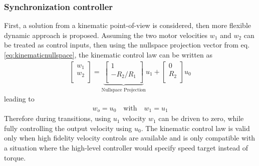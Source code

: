 \subsubsection{Synchronization controller}
First, a solution from a kinematic point-of-view is considered, then more flexible dynamic approach is proposed. Assuming the two motor velocities $w_1$ and $w_2$ can be treated as control inputs, then using the nullspace projection vector from eq.\eqref{eq:kinematicnullspace}, the kinematic control law can be written as 
%
\begin{align}
\left[
\begin{array}{c}
w_1 \\
w_2 \\
\end{array}
\right]=
\underbrace{\left[
\begin{array}{c}
1 \\
-R_2/R_1 \\
\end{array}
\right]}_{\text{Nullspace Projection}}
u_1 + 
\left[
\begin{array}{c}
0 \\
R_2 \\
\end{array}
\right] u_0
\label{eq:kinematicsys}
\end{align}
%
leading to
%
\begin{align}
w_o = u_0 \quad \text{with} \quad w_1 = u_1
\end{align}
%
Therefore during transitions, using $u_1$ velocity $w_1$ can be driven to zero, while fully controlling the output velocity using $u_0$. The kinematic control law is valid only when high fidelity velocity controls are available and is only compatible with a situation where the high-level controller would specify speed target instead of torque. 

